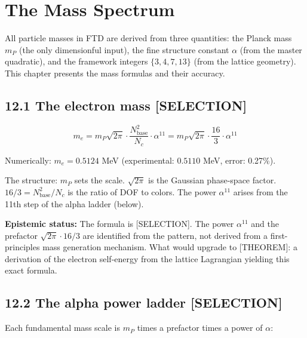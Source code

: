 \documentclass[
  11pt,
  letterpaper,
  twoside,
  openright]{book}
\begin{document}
\chapter{The Mass Spectrum}\label{sec-masses}

All particle masses in FTD are derived from three quantities: the Planck
mass \(m_P\) (the only dimensionful input), the fine structure constant
\(\alpha\) (from the master quadratic), and the framework integers
\(\{3, 4, 7, 13\}\) (from the lattice geometry). This chapter presents
the mass formulas and their accuracy.

\section{12.1 The electron mass
{[}SELECTION{]}}\label{the-electron-mass-selection}

\[
m_e = m_P \sqrt{2\pi} \cdot \frac{N_{\text{base}}^2}{N_c} \cdot \alpha^{11} = m_P \sqrt{2\pi} \cdot \frac{16}{3} \cdot \alpha^{11}
\tag{12.1}
\]

Numerically: \(m_e = 0.5124\) MeV (experimental: \(0.5110\) MeV, error:
0.27\%).

The structure: \(m_P\) sets the scale. \(\sqrt{2\pi}\) is the Gaussian
phase-space factor. \(16/3 = N_{\text{base}}^2/N_c\) is the ratio of DOF
to colors. The power \(\alpha^{11}\) arises from the 11th step of the
alpha ladder (below).

\textbf{Epistemic status:} The formula is {[}SELECTION{]}. The power
\(\alpha^{11}\) and the prefactor \(\sqrt{2\pi} \cdot 16/3\) are
identified from the pattern, not derived from a first-principles mass
generation mechanism. What would upgrade to {[}THEOREM{]}: a derivation
of the electron self-energy from the lattice Lagrangian yielding this
exact formula.

\section{12.2 The alpha power ladder
{[}SELECTION{]}}\label{the-alpha-power-ladder-selection}

Each fundamental mass scale is \(m_P\) times a prefactor times a power
of \(\alpha\):
\end{document}
